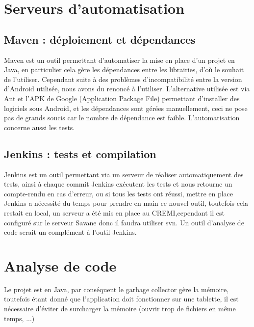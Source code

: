 \section{Serveurs d'automatisation}

\subsection{Maven : déploiement et dépendances}
Maven est un outil permettant d'automatiser la mise en place d'un projet en Java, en particulier cela gère les dépendances entre les librairies, d'où
le souhait de l'utiliser. Cependant suite à des problèmes d'incompatibilité entre la version d'Android utilisée, nous avons du renoncé à l'utiliser.
L'alternative utilisée est via Ant et l'APK de Google (Application Package File) permettant d'installer des logiciels sous Android,
et les dépendances sont gérées manuellement, ceci ne pose pas de grands soucis car le nombre de dépendance est faible.
L'automatisation concerne aussi les tests.

\subsection{Jenkins : tests et compilation}
Jenkins est un outil permettant via un serveur de réaliser automatiquement des tests, ainsi à chaque commit Jenkins exécutent les tests et nous retourne
un compte-rendu en cas d'erreur, ou si tous les tests ont réussi, mettre en place Jenkins a nécessité du temps pour prendre en main ce nouvel outil,
toutefois cela restait en local, un serveur a été mis en place au CREMI,cependant il est configuré sur le serveur Savane donc il faudra utiliser svn.
Un outil d'analyse de code serait un complément à l'outil Jenkins.


\section{Analyse de code}

Le projet est en Java, par conséquent le garbage collector gère la mémoire, toutefois étant donné que l'application doit 
fonctionner sur une tablette, il est nécessaire d'éviter de surcharger la mémoire (ouvrir trop de fichiers en même temps, ...)
